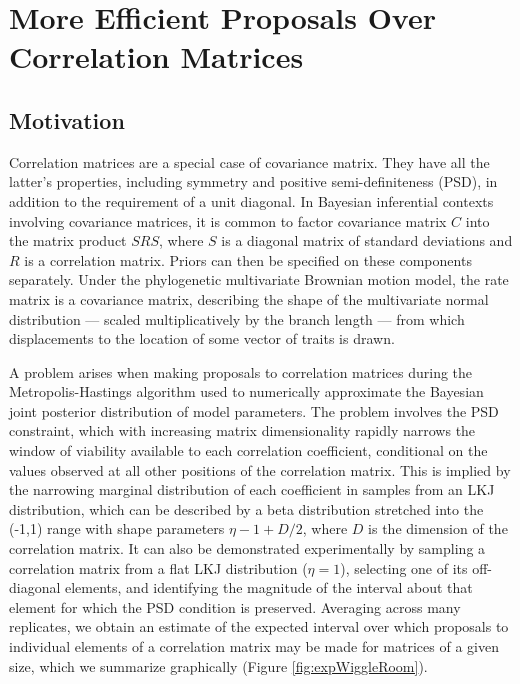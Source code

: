 
\chapter{More Efficient Proposals Over Correlation Matrices}

\label{app:App2}

\clearpage

\section{Motivation}

Correlation matrices are a special case of covariance matrix. They have all the latter's properties, including symmetry and positive semi-definiteness (PSD), in addition to the requirement of a unit diagonal. In Bayesian inferential contexts involving covariance matrices, it is common to factor covariance matrix $C$ into the matrix product $SRS$, where $S$ is a diagonal matrix of standard deviations and $R$ is a correlation matrix. Priors can then be specified on these components separately. Under the phylogenetic multivariate Brownian motion model, the rate matrix is a covariance matrix, describing the shape of the multivariate normal distribution --- scaled multiplicatively by the branch length --- from which displacements to the location of some vector of traits is drawn.

A problem arises when making proposals to correlation matrices during the Metropolis-Hastings algorithm \citep{hastingsMonteCarloSampling1970} used to numerically approximate the Bayesian joint posterior distribution of model parameters. The problem involves the PSD constraint, which with increasing matrix dimensionality rapidly narrows the window of viability available to each correlation coefficient, conditional on the values observed at all other positions of the correlation matrix. This is implied by the narrowing marginal distribution of each coefficient in samples from an LKJ distribution, which can be described by a beta distribution stretched into the (-1,1) range with shape parameters $\eta -1 + D/2$, where $D$ is the dimension of the correlation matrix. It can also be demonstrated experimentally by sampling a correlation matrix from a flat LKJ distribution ($\eta = 1$), selecting one of its off-diagonal elements, and identifying the magnitude of the interval about that element for which the PSD condition is preserved. Averaging across many replicates, we obtain an estimate of the expected interval over which proposals to individual elements of a correlation matrix may be made for matrices of a given size, which we summarize graphically (Figure \ref{fig:expWiggleRoom}).

